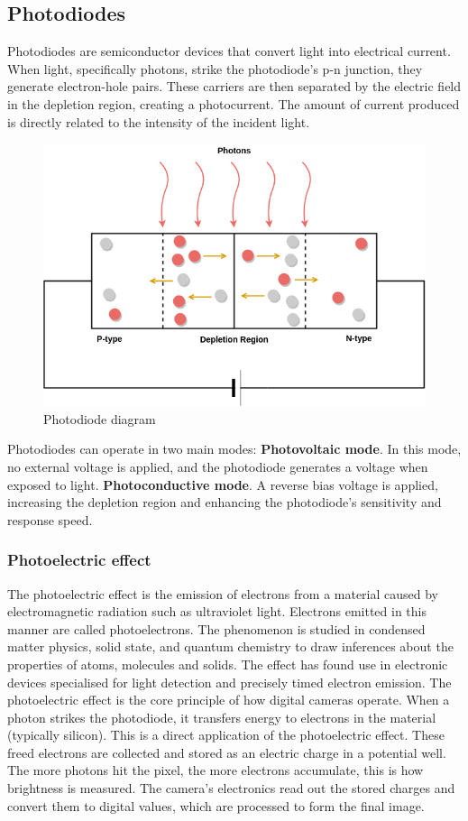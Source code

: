 \documentclass[10pt]{article}
\begin{document}
\begin{multicols}{2}
\subsection{Photodiodes}
Photodiodes are semiconductor devices that convert light into electrical current. When light, specifically photons, strike the photodiode's p-n junction, they generate electron-hole pairs. These carriers are then separated by the electric field in the depletion region, creating a photocurrent. The amount of current produced is directly related to the intensity of the incident light. 
\begin{figure}[H]
    \centering
    \includegraphics[width=0.8\linewidth]{Images/Week 2/photodiode.png}
    \caption{Photodiode diagram}
\end{figure}
Photodiodes can operate in two main modes:
\newline
\textbf{Photovoltaic mode}. In this mode, no external voltage is applied, and the photodiode generates a voltage when exposed to light.
\newline
\textbf{Photoconductive mode}. A reverse bias voltage is applied, increasing the depletion region and enhancing the photodiode's sensitivity and response speed.

\subsubsection{Photoelectric effect}
The photoelectric effect is the emission of electrons from a material caused by electromagnetic radiation such as ultraviolet light. Electrons emitted in this manner are called photoelectrons. The phenomenon is studied in condensed matter physics, solid state, and quantum chemistry to draw inferences about the properties of atoms, molecules and solids. The effect has found use in electronic devices specialised for light detection and precisely timed electron emission.
\newline \newline
The photoelectric effect is the core principle of how digital cameras operate. When a photon strikes the photodiode, it transfers energy to electrons in the material (typically silicon). This is a direct application of the photoelectric effect. These freed electrons are collected and stored as an electric charge in a potential well. The more photons hit the pixel, the more electrons accumulate, this is how brightness is measured. The camera's electronics read out the stored charges and convert them to digital values, which are processed to form the final image.


\end{multicols}
\end{document}
